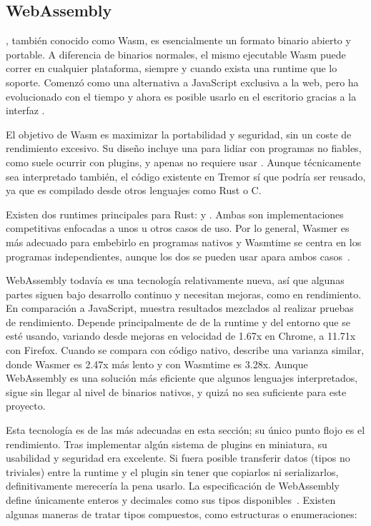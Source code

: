 \subsection{WebAssembly}

, también conocido como Wasm, es esencialmente un formato binario
abierto y portable. A diferencia de binarios normales, el mismo ejecutable Wasm
puede correr en cualquier plataforma, siempre y cuando exista una runtime que lo
soporte. Comenzó como una alternativa a JavaScript exclusiva a la web, pero ha
evolucionado con el tiempo y ahora es posible usarlo en el escritorio gracias a
la interfaz .

El objetivo de Wasm es maximizar la portabilidad y seguridad, sin un coste de
rendimiento excesivo. Su diseño incluye una \sandbox para lidiar con programas
no fiables, como suele ocurrir con plugins, y apenas no requiere usar \unsafe.
Aunque técnicamente sea interpretado también, el código existente en Tremor sí
que podría ser reusado, ya que es compilado desde otros lenguajes como Rust o C.

Existen dos runtimes principales para Rust:  y
. Ambas son implementaciones competitivas enfocadas a unos u
otros casos de uso. Por lo general, Wasmer es más adecuado para embebirlo en
programas nativos y Wasmtime se centra en los programas independientes, aunque
los dos se pueden usar apara ambos casos~\cite{wasmwikiusage}.

WebAssembly todavía es una tecnología relativamente nueva, así que algunas
partes siguen bajo desarrollo continuo y necesitan mejoras, como en rendimiento.
En comparación a JavaScript, \textcite{jangda2019not} muestra resultados
mezclados al realizar pruebas de rendimiento. Depende principalmente de de la
runtime y del entorno que se esté usando, variando desde mejoras en velocidad de
1.67x en Chrome, a 11.71x con Firefox. Cuando se compara con código nativo,
\textcite{libsodiumwasmperf} describe una varianza similar, donde Wasmer es
2.47x más lento y con Wasmtime es 3.28x. Aunque WebAssembly es una solución más
eficiente que algunos lenguajes interpretados, sigue sin llegar al nivel de
binarios nativos, y quizá no sea suficiente para este proyecto.

Esta tecnología es de las más adecuadas en esta sección; su único punto flojo es
el rendimiento. Tras implementar algún sistema de plugins en miniatura, su
usabilidad y seguridad era excelente. Si fuera posible transferir datos (tipos
no triviales) entre la runtime y el plugin sin tener que copiarlos ni
serializarlos, definitivamente merecería la pena usarlo. La especificación de
WebAssembly define únicamente enteros y decimales como sus tipos
disponibles~\cite{wasmertypes}. Existen algunas maneras de tratar tipos
compuestos, como estructuras o enumeraciones:

